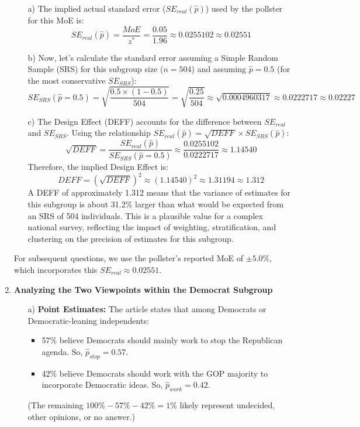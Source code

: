\documentclass[12pt]{article}
\begin{document}
\begin{enumerate}
\begin{itemize}
    \item[a)] The implied actual standard error ($SE_{real}(\hat{p})$) used by the pollster for this MoE is:
    \[
    SE_{real}(\hat{p}) = \frac{MoE}{z^*} = \frac{0.05}{1.96} \approx 0.0255102 \approx 0.02551
    \]
    \item[b)] Now, let's calculate the standard error assuming a Simple Random Sample (SRS) for this subgroup size ($n=504$) and assuming $\hat{p}=0.5$ (for the most conservative $SE_{SRS}$):
    \[
    SE_{SRS}(\hat{p}=0.5) = \sqrt{\frac{0.5 \times (1-0.5)}{504}} = \sqrt{\frac{0.25}{504}} \approx \sqrt{0.0004960317} \approx 0.0222717 \approx 0.02227
    \]
    \item[c)] The Design Effect (DEFF) accounts for the difference between $SE_{real}$ and $SE_{SRS}$. Using the relationship $SE_{real}(\hat{p}) = \sqrt{DEFF} \times SE_{SRS}(\hat{p})$:
    \[
    \sqrt{DEFF} = \frac{SE_{real}(\hat{p})}{SE_{SRS}(\hat{p}=0.5)} \approx \frac{0.0255102}{0.0222717} \approx 1.14540
    \]
    Therefore, the implied Design Effect is:
    \[
    DEFF = (\sqrt{DEFF})^2 \approx (1.14540)^2 \approx 1.31194 \approx 1.312
    \]
    A DEFF of approximately 1.312 means that the variance of estimates for this subgroup is about 31.2\% larger than what would be expected from an SRS of 504 individuals. This is a plausible value for a complex national survey, reflecting the impact of weighting, stratification, and clustering on the precision of estimates for this subgroup.
\end{itemize}
For subsequent questions, we use the pollster's reported MoE of $\pm 5.0\%$, which incorporates this $SE_{real} \approx 0.02551$.


\item \textbf{Analyzing the Two Viewpoints within the Democrat Subgroup}

\begin{itemize}
    \item[a)] \textbf{Point Estimates:}
    The article states that among Democrats or Democratic-leaning independents:
    \begin{itemize}
        \item 57\% believe Democrats should mainly work to stop the Republican agenda. So, $\hat{p}_{stop} = 0.57$.
        \item 42\% believe Democrats should work with the GOP majority to incorporate Democratic ideas. So, $\hat{p}_{work} = 0.42$.
    \end{itemize}
    (The remaining $100\% - 57\% - 42\% = 1\%$ likely represent undecided, other opinions, or no answer.)


\end{itemize}
\end{enumerate}
\end{document}
